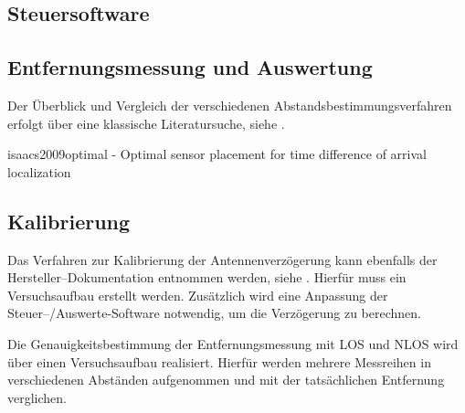 \subsection{Steuersoftware}


\subsection{Entfernungsmessung und Auswertung}
Der Überblick und Vergleich der verschiedenen Abstandsbestimmungsverfahren erfolgt über eine klassische Literatursuche, siehe \cite{lee2007comparative, herranz2010studying, zekavat2011handbook}.


isaacs2009optimal - Optimal sensor placement for time difference of arrival localization



\subsection{Kalibrierung}

Das Verfahren zur Kalibrierung der Antennenverzögerung kann ebenfalls der Hersteller--Dokumentation entnommen werden, siehe \cite{decawave2014calibration}. Hierfür muss ein Versuchsaufbau erstellt werden. Zusätzlich wird eine Anpassung der Steuer--/Auswerte-Software notwendig, um die Verzögerung zu berechnen.

Die Genauigkeitsbestimmung der Entfernungsmessung mit LOS und NLOS wird über einen Versuchsaufbau realisiert. Hierfür werden mehrere Messreihen in verschiedenen Abständen aufgenommen und mit der tatsächlichen Entfernung verglichen.